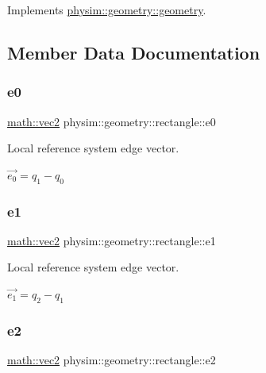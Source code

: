 Implements \hyperlink{classphysim_1_1geometry_1_1geometry_afb3aefeefc98c6d310d7dd93a9d4ff9c}{physim\+::geometry\+::geometry}.



\subsection{Member Data Documentation}
\mbox{\label{classphysim_1_1geometry_1_1rectangle_a44c4dbc41d09ca3a2825419dd4b9a84e}} 
\subsubsection{\texorpdfstring{e0}{e0}}
{\footnotesize\ttfamily \hyperlink{structphysim_1_1math_1_1vec2}{math\+::vec2} physim\+::geometry\+::rectangle\+::e0\hspace{0.3cm}{\ttfamily [private]}}



Local reference system edge vector. 

$\vec{e_0} = q_1 - q_0$ \mbox{\label{classphysim_1_1geometry_1_1rectangle_a2cf9abe7981c380a6611908735846078}} 
\subsubsection{\texorpdfstring{e1}{e1}}
{\footnotesize\ttfamily \hyperlink{structphysim_1_1math_1_1vec2}{math\+::vec2} physim\+::geometry\+::rectangle\+::e1\hspace{0.3cm}{\ttfamily [private]}}



Local reference system edge vector. 

$\vec{e_1} = q_2 - q_1$ \mbox{\label{classphysim_1_1geometry_1_1rectangle_afb0095ec1886e7f8e85b69d995c07d2d}} 
\subsubsection{\texorpdfstring{e2}{e2}}
{\footnotesize\ttfamily \hyperlink{structphysim_1_1math_1_1vec2}{math\+::vec2} physim\+::geometry\+::rectangle\+::e2\hspace{0.3cm}{\ttfamily [private]}}



